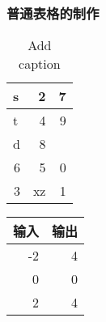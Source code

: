\documentclass[UTF8]{ctexbook}
\begin{document}
\subsubsection{普通表格的制作}


	\begin{table}[htbp]
		\centering
		\caption{Add caption}
		\begin{tabular}{|rlr|}
			\toprule
			\multicolumn{1}{|l}{s} & \multicolumn{1}{r}{2} & 7 \\
			\midrule
			\multicolumn{1}{|l}{t} & \multicolumn{1}{r}{4} & 9 \\
			\midrule
			\multicolumn{1}{|l}{d} & \multicolumn{1}{r}{8} &  \\
			\midrule
			6     & \multicolumn{1}{r}{5} & 0 \\
			\midrule
			3     & xz    & 1 \\
			\bottomrule
		\end{tabular}%
		\label{tab:addlabel}%
	\end{table}%
	
	


\begin{tabular}{|r|r|}%
	\hline
	输入&输出\\ 
	\hline
	-2&4\\ \hline
	0&0\\ \hline
	2&4\\\hline
\end{tabular}
\end{document}
